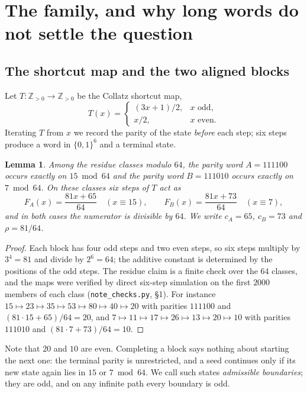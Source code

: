 \documentclass[11pt,a4paper]{article}
\theoremstyle{plain}
\newtheorem{lemma}[theorem]{Lemma}
\theoremstyle{definition}
\theoremstyle{remark}
\newcommand{\Zpos}{\mathbb{Z}_{>0}}
\begin{document}
\section{The family, and why long words do not settle the question}

\subsection{The shortcut map and the two aligned blocks}

Let $T\colon\Zpos\to\Zpos$ be the Collatz shortcut map,
\[
T(x)=\begin{cases} (3x+1)/2, & x \text{ odd},\\ x/2, & x \text{ even}.\end{cases}
\]
Iterating $T$ from $x$ we record the parity of the state \emph{before} each
step; six steps produce a word in $\{0,1\}^6$ and a terminal state.

\begin{lemma}\label{lem:blocks}
Among the residue classes modulo $64$, the parity word $A=111100$ occurs
exactly on $15 \bmod 64$ and the parity word $B=111010$ occurs exactly on
$7\bmod 64$. On these classes six steps of $T$ act as
\[
F_A(x)=\frac{81x+65}{64}\quad (x\equiv 15),\qquad
F_B(x)=\frac{81x+73}{64}\quad (x\equiv 7),
\]
and in both cases the numerator is divisible by $64$. We write
$c_A=65$, $c_B=73$ and $\rho=81/64$.
\end{lemma}

\begin{proof}
Each block has four odd steps and two even steps, so six steps multiply by
$3^4=81$ and divide by $2^6=64$; the additive constant is determined by the
positions of the odd steps. The residue claim is a finite check over the $64$
classes, and the maps were verified by direct six-step simulation on the first
$2000$ members of each class (\texttt{note\_checks.py}, \S1). For instance
$15\mapsto 23\mapsto 35\mapsto 53\mapsto 80\mapsto 40\mapsto 20$ with parities
$111100$ and $(81\cdot 15+65)/64=20$, and
$7\mapsto 11\mapsto 17\mapsto 26\mapsto 13\mapsto 20\mapsto 10$ with parities
$111010$ and $(81\cdot 7+73)/64=10$.
\end{proof}

Note that $20$ and $10$ are even. Completing a block says nothing about
starting the next one: the terminal parity is unrestricted, and a seed
continues only if its new state again lies in $15$ or $7 \bmod 64$. We call
such states \emph{admissible boundaries}; they are odd, and on any infinite
path every boundary is odd.
\end{document}
